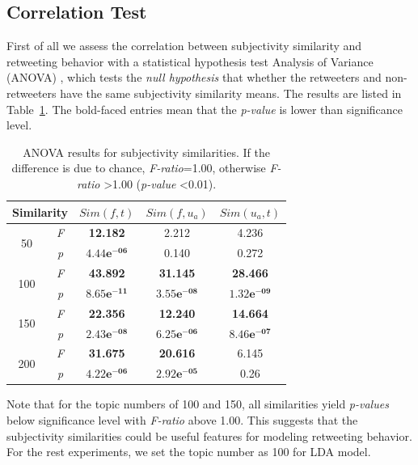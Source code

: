 \documentclass[letterpaper]{article}
\begin{document}
\subsection{Correlation Test}

First of all we assess the correlation between subjectivity similarity and retweeting behavior with a statistical hypothesis test Analysis of Variance (ANOVA) \cite{fisher1970statistical}, which tests the \textit{null hypothesis} that whether the retweeters and non-retweeters have the same subjectivity similarity means. 
The results are listed in Table~\ref{tab2}. The bold-faced entries mean that the \textit{p-value} is lower than significance level.
\begin{table}[htb]
\scriptsize
\centering
\caption{ANOVA results for subjectivity similarities. If the difference is due to chance, \textit{F-ratio}=1.00, otherwise \textit{F-ratio} \textgreater 1.00 (\textit{p-value} \textless 0.01).}
\label{tab2}
\begin{tabular}{|c|c|c|c|c|}
\hline
\multicolumn{2}{|c|}{Similarity}& $ Sim(f,t) $ & $ Sim(f,u_a)  $ & $ Sim(u_a,t)  $\\
\hline
\multirow{2}{*}{50} & \textit{F} & \textbf{12.182} & 2.212 & 4.236 \\
\cline{2-5}
  & \textit{p} &  $\mathbf{4.44e^{-06}}$  & 0.140 & 0.272\\
\hline
\multirow{2}{*}{100} & \textit{F} & \textbf{43.892} & \textbf{31.145} & \textbf{28.466} \\
\cline{2-5}
  & \textit{p} &  $\mathbf{8.65e^{-11}}$  & $\mathbf{3.55e^{-08}}$ & $\mathbf{1.32e^{-09}}$\\
\hline
\multirow{2}{*}{150} & \textit{F} & \textbf{22.356} & \textbf{12.240} & \textbf{14.664} \\
\cline{2-5}
  & \textit{p} &  $\mathbf{2.43e^{-08}}$  & $\mathbf{6.25e^{-06}}$ & $\mathbf{8.46e^{-07}}$\\
\hline
\multirow{2}{*}{200} & \textit{F} & \textbf{31.675} & \textbf{20.616} & 6.145\\
\cline{2-5}
  & \textit{p} &  $\mathbf{4.22e^{-06}}$  & $\mathbf{2.92e^{-05}}$ & 0.26\\
\hline
\end{tabular}
\end{table}
Note that for the topic numbers of 100 and 150, all similarities yield \textit{p-values} below significance level with \textit{F-ratio} above 1.00. This suggests that the subjectivity similarities could be useful features for modeling retweeting behavior. 
For the rest experiments, we set the topic number as 100 for LDA model. 
\end{document}
